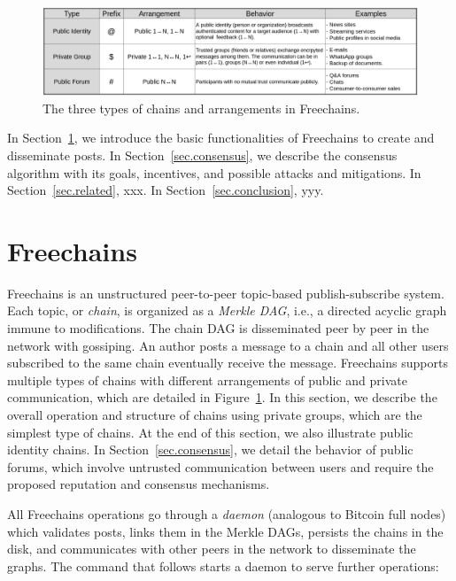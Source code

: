 \documentclass[10pt,journal,compsoc]{IEEEtran}
\newcommand{\FC}   {Freechains\xspace}
\begin{document}
\begin{figure}[ht]
\centering
\includegraphics[width=\textwidth]{arrangements.png}
%
%
\caption{The three types of chains and arrangements in \FC.}
\label{fig.table}
\end{figure}

In Section~\ref{sec.freechains}, we introduce the basic functionalities of \FC
to create and disseminate posts.
In Section~\ref{sec.consensus}, we describe the consensus algorithm with its
goals, incentives, and possible attacks and mitigations.
In Section~\ref{sec.related}, xxx.
In Section~\ref{sec.conclusion}, yyy.

\section{Freechains}
\label{sec.freechains}

\FC is an unstructured peer-to-peer topic-based publish-subscribe system.
Each topic, or \emph{chain}, is organized as a \emph{Merkle DAG}, i.e., a
directed acyclic graph immune to modifications.
The chain DAG is disseminated peer by peer in the network with gossiping.
An author posts a message to a chain and all other users subscribed to the same
chain eventually receive the message.
\FC supports multiple types of chains with different arrangements of public and
private communication, which are detailed in Figure~\ref{fig.table}.
In this section, we describe the overall operation and structure of chains
using private groups, which are the simplest type of chains.
At the end of this section, we also illustrate public identity chains.
In Section~\ref{sec.consensus}, we detail the behavior of public forums, which
involve untrusted communication between users and require the proposed
reputation and consensus mechanisms.

All \FC operations go through a \emph{daemon} (analogous to Bitcoin full nodes)
which validates posts, links them in the Merkle DAGs, persists the chains in
the disk, and communicates with other peers in the network to disseminate the
graphs.
The command that follows starts a daemon to serve further operations:
\end{document}
